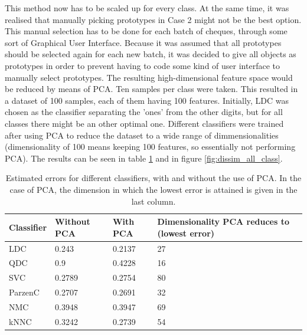 \noindent This method now has to be scaled up for every class. At the same time, it was realised that manually picking prototypes in Case 2 might not be the best option. This manual selection has to be done for each batch of cheques, through some sort of Graphical User Interface. Because it was assumed that all prototypes should be selected again for each new batch, it was decided to give all objects as prototypes in order to prevent having to code some kind of user interface to manually select prototypes. The resulting high-dimensional feature space would be reduced by means of PCA. Ten samples per class were taken. This resulted in a dataset of 100 samples, each of them having 100 features. Initially, LDC was chosen as the classifier separating the 'ones' from the other digits, but for all classes there might be an other optimal one. Different classifiers were trained after using PCA to reduce the dataset to a wide range of dimmensionalities (dimensionality of 100 means keeping 100 features, so essentially not performing PCA). The results can be seen in table \ref{tab:dissim_all_class} and in figure \ref{fig:dissim_all_class}.
\begin{table}[H]
	\centering
	\caption{Estimated errors for different classifiers, with and without the use of PCA. In the case of PCA, the dimension in which the lowest error is attained is given in the last column.}
	\label{tab:dissim_all_class}
	\begin{tabular}{l|lll}
		Classifier & Without PCA & With PCA & Dimensionality PCA reduces to (lowest error) \\ \hline
		LDC        & 0.243       & 0.2137   & 27                                           \\
		QDC        & 0.9         & 0.4228   & 16                                           \\
		SVC        & 0.2789      & 0.2754   & 80                                           \\
		ParzenC    & 0.2707      & 0.2691   & 32                                           \\
		NMC        & 0.3948      & 0.3947   & 69                                           \\
		kNNC       & 0.3242      & 0.2739   & 54                                          
	\end{tabular}
\end{table}
